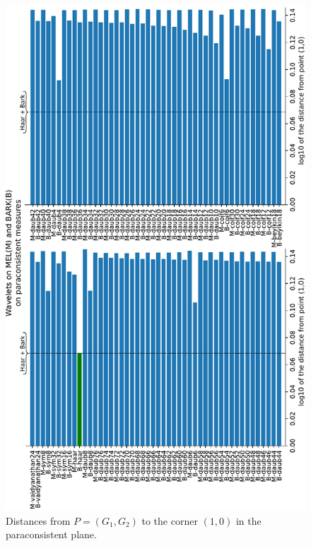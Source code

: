 	\begin{figure}[H]
		\centering
		\includegraphics[angle=-90,scale=.49]{images/results/paraconsistentPlane/ParaconsistentFull.pdf}
		\caption{Distances from $P=(G_1,G_2)$ to the corner $(1,0)$ in the paraconsistent plane.}
		\label{fig:paraconsistentfull}
	\end{figure}
	
	
